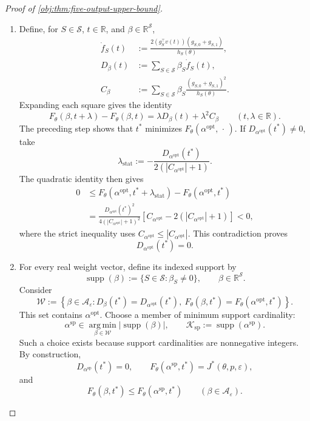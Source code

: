 \begin{proof}[Proof of \cref{obj:thm:five-output-upper-bound}]
\begin{enumerate}
\item
Define, for \(S\in\mathcal S\), \(t\in\mathbb R\), and
\(\beta\in\mathbb R^{\mathcal S}\),
\[
\begin{aligned}
\dot f_S(t)
&:=\frac{2(g_S^\top v(t))(g_{S,0}+g_{S,1})}{h_S(\theta)},\\
D_\beta(t)&:=\sum_{S\in\mathcal S}\beta_S\dot f_S(t),\\
C_\beta&:=\sum_{S\in\mathcal S}
\beta_S\frac{(g_{S,0}+g_{S,1})^2}{h_S(\theta)}.
\end{aligned}
\]
Expanding each square gives the identity
\[
F_\theta(\beta,t+\lambda)-F_\theta(\beta,t)
=
\lambda D_\beta(t)+\lambda^2C_\beta
\qquad(t,\lambda\in\mathbb R).
\]
The preceding step shows that \(t^*\) minimizes
\(F_\theta(\alpha^{\mathrm{opt}},\,\cdot\,)\).
If \(D_{\alpha^{\mathrm{opt}}}(t^*)\ne0\), take
\[
\lambda_{\mathrm{stat}}
:=
-\frac{D_{\alpha^{\mathrm{opt}}}(t^*)}
{2(|C_{\alpha^{\mathrm{opt}}}|+1)}.
\]
The quadratic identity then gives
\[
\begin{aligned}
0
&\le
F_\theta(\alpha^{\mathrm{opt}},t^*+\lambda_{\mathrm{stat}})
-F_\theta(\alpha^{\mathrm{opt}},t^*)\\
&=
\frac{D_{\alpha^{\mathrm{opt}}}(t^*)^2}
{4(|C_{\alpha^{\mathrm{opt}}}|+1)^2}
\left[
C_{\alpha^{\mathrm{opt}}}
-2(|C_{\alpha^{\mathrm{opt}}}|+1)
\right]
<0,
\end{aligned}
\]
where the strict inequality uses
\(C_{\alpha^{\mathrm{opt}}}\le|C_{\alpha^{\mathrm{opt}}}|\).
This contradiction proves
\[
D_{\alpha^{\mathrm{opt}}}(t^*)=0.
\]

\item
For every real weight vector, define its indexed support by
\[
\operatorname{supp}(\beta)
:=\{S\in\mathcal S:\beta_S\ne0\},
\qquad \beta\in\mathbb R^{\mathcal S}.
\]
Consider
\[
\mathcal W:=
\left\{\beta\in\mathcal A_\varepsilon:
D_\beta(t^*)=D_{\alpha^{\mathrm{opt}}}(t^*),\
F_\theta(\beta,t^*)=F_\theta(\alpha^{\mathrm{opt}},t^*)
\right\}.
\]
This set contains \(\alpha^{\mathrm{opt}}\).
Choose a member of minimum support cardinality:
\[
\alpha^{\mathrm{sp}}
\in\operatorname*{arg\,min}_{\beta\in\mathcal W}
|\operatorname{supp}(\beta)|,
\qquad
\mathcal K_{\mathrm{sp}}:=\operatorname{supp}(\alpha^{\mathrm{sp}}).
\]
Such a choice exists because support cardinalities are nonnegative
integers. By construction,
\[
D_{\alpha^{\mathrm{sp}}}(t^*)=0,
\qquad
F_\theta(\alpha^{\mathrm{sp}},t^*)=J^*(\theta,p,\varepsilon),
\]
and
\[
F_\theta(\beta,t^*)\le F_\theta(\alpha^{\mathrm{sp}},t^*)
\qquad(\beta\in\mathcal A_\varepsilon).
\]


\end{enumerate}
\end{proof}
